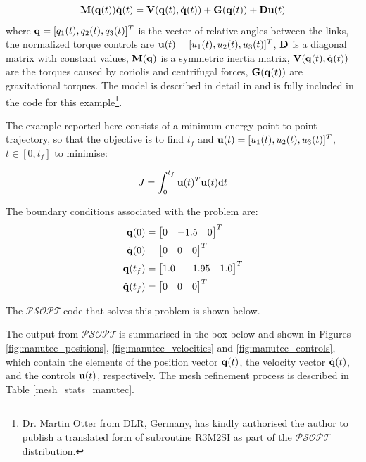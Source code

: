 \documentclass[a4paper,11pt]{report}    %
\newcommand{\psopt}{$\mathcal{PSOPT}$\,}  %
\newcommand{\mt}[1]{\ensuremath \mathbf{#1}}
\newenvironment{shadedframe}{%
  \def\FrameCommand{\fcolorbox{black}{shadecolor}}%
  \MakeFramed {\FrameRestore}}
{\endMakeFramed}
\begin{document}
\[
  \mt{M}(\mt{q}(t)) \ddot{\mt{q}}(t) = \mt{V}(\mt{q}(t), \dot{\mt{q}}(t) ) + \mt{G}(\mt{q}(t)) + \mt{D} \mt{u}(t)
\]
where $\mt{q} = [ q_1(t), q_2(t), q_3(t) ]^T$ is the vector of  relative angles between the links, the normalized torque controls are
$\mt{u}(t) = [ u_1(t), u_2(t), u_3(t) ]^T$, $\mt{D}$ is a diagonal matrix with constant values, $\mt{M}(\mt{q})$ is a
symmetric inertia matrix,  $\mt{V}(\mt{q}(t), \dot{\mt{q}}(t) )$ are the torques caused by coriolis and centrifugal
forces, $\mt{G}(\mt{q}(t))$ are gravitational torques. The model is described in detail in \cite{Otter:88} and is 
fully included in the code for this example\footnote{Dr. Martin Otter from DLR, Germany, 
has kindly authorised the author to publish  a translated form of subroutine R3M2SI as part of the \psopt distribution.}. 

The example reported here consists of a minimum energy point to point trajectory, so that the objective is to find $t_f$ and 
$\mt{u}(t) = [ u_1(t), u_2(t), u_3(t) ]^T$, $t \in [0, t_f]$ to minimise:


\begin{equation}
  J =  \int_0^{t_f} \mt{u}(t)^T \mt{u}(t)  \mathrm{d}t 
\end{equation}


The boundary conditions associated with the problem are:
\begin{equation}
  \begin{aligned}
  \mt{q}(0) &= \begin{bmatrix} 0 & -1.5 & 0  \end{bmatrix}^T \\
  \dot{\mt{q}}(0) &= \begin{bmatrix} 0 & 0 & 0  \end{bmatrix}^T \\
  \mt{q}(t_f) &= \begin{bmatrix}  1.0 & -1.95 & 1.0  \end{bmatrix}^T  \\
  \dot{\mt{q}}(t_f) &= \begin{bmatrix} 0 & 0 & 0  \end{bmatrix}^T 
  \end{aligned}
\end{equation}


The
\psopt code that solves this problem is shown below.  

\tiny
\begin{shadedframe}

\end{shadedframe}
\normalsize
The output from \psopt is summarised in the box below and shown in Figures \ref{fig:manutec_positions}, \ref{fig:manutec_velocities} and \ref{fig:manutec_controls}, which contain the elements of
the position vector $\mt{q}(t)$, the velocity vector $\dot{\mt{q}}(t)$, and the controls $\mt{u}(t)$, respectively. 
The mesh refinement process is described in Table \ref{mesh_stats_manutec}.
\end{document}
